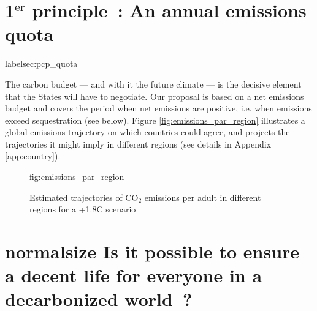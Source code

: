 \documentclass[a5paper,french,openany]{memoir}
\begin{document}
\section{1$^\text{er}$ principle~: An annual emissions quota}label{sec:pcp_quota}

The carbon budget --- and with it the future climate --- is the decisive element that the States will have to negotiate. 
Our proposal is based on a net emissions budget and covers the period when net emissions are positive, i.e. when emissions exceed sequestration (see below). Figure \ref{fig:emissions_par_region} illustrates a global emissions trajectory on which countries could agree, and projects the trajectories it might imply in different regions (see details in Appendix \ref{app:country}). 

\begin{figure}[h!]
  \caption[Emissions trajectories by region]{Estimated trajectories of CO$_\text{2}$ emissions per adult in different regions for a +1.8\textdegree{}C scenario}{fig:emissions_par_region}
\end{figure}




\section*{normalsize Is it possible to ensure a decent life for everyone in a decarbonized world~?}\label{q:decent}
\end{document}
